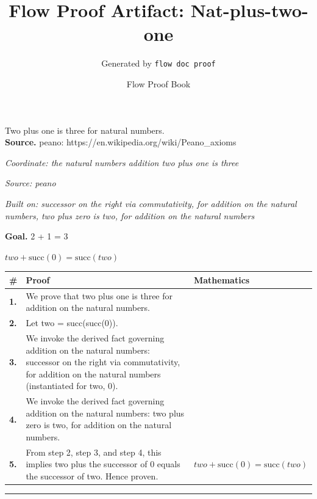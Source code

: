 \documentclass[11pt]{article}
\title{Flow Proof Artifact: Nat-plus-two-one}
\author{Generated by \texttt{flow doc proof}}
\date{Flow Proof Book}
\theoremstyle{definition}
\begin{document}
\maketitle
Two plus one is three for natural numbers.\\[0.5em]
\textbf{Source.} peano: https://en.wikipedia.org/wiki/Peano\_axioms\\[0.5em]
\bigskip
{}\par
\smallskip\noindent\textit{Coordinate: the natural numbers \cdot addition \cdot two plus one is three}\par
\smallskip\noindent\textit{Source: peano}\par
\smallskip\noindent\textit{Built on: successor on the right via commutativity, for addition on the natural numbers, two plus zero is two, for addition on the natural numbers}\par
\medskip
\noindent\textbf{Goal.} 2 + 1 = 3\par
\noindent$\displaystyle two + \mathrm{succ}(0) = \mathrm{succ}(two)$\par
\medskip
\noindent
\begin{tabular}{@{} >{\raggedright\arraybackslash}p{} >{\raggedright\arraybackslash}p{} >{\raggedleft\arraybackslash}p{} @{}}
\textbf{\#} & \textbf{Proof} & \textbf{Mathematics} \\
\midrule
\textbf{1.} & We prove that two plus one is three for addition on the natural numbers. & \\[0.45em]
\textbf{2.} & Let two = succ(succ(0)). & \\[0.45em]
\textbf{3.} & We invoke the derived fact governing addition on the natural numbers: successor on the right via commutativity, for addition on the natural numbers (instantiated for two, 0). & \\[0.45em]
\textbf{4.} & We invoke the derived fact governing addition on the natural numbers: two plus zero is two, for addition on the natural numbers. & \\[0.45em]
\textbf{5.} & From step 2, step 3, and step 4, this implies two plus the successor of 0 equals the successor of two. Hence proven. & $\displaystyle two + \mathrm{succ}(0) = \mathrm{succ}(two)$ \\[0.45em]
\bottomrule
\end{tabular}
\label{thm:Nat-addition-two_plus_one_is_three}
\par\medskip\hrule
\end{document}
